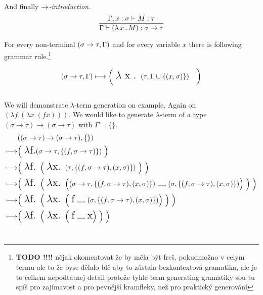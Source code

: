 \documentclass[12pt,a4paper]{report}
\newcommand{\lterm}{$\lambda$-term\xspace}
\newcommand{\tur}[3]{#1\vdash{}#2:#3}
\newcommand\Vtextvisiblespace[1][.3em]{%
  \mbox{\kern.06em\vrule height.3ex}%
  \vbox{\hrule width#1}%
  \hbox{\vrule height.3ex}}
\begin{document}
And finally {\it $\rightarrow$-introduction}. 
$$
\ruleI { \tur{\Gamma,x:\sigma}{M}{\tau} }
       { \tur{\Gamma}{\lamb{x}{M}}{\sigma \ar \tau} }
$$

For every non-terminal $(\sigma \rightarrow \tau,\Gamma)$
and for every variable $x$
there is following grammar rule.\footnote{
\textbf{TODO !!!!} nějak okomentovat že by měla být freš,
pokudmožno v celym termu ale to že byse dělalo blě aby to
zůstala bezkontextová gramatika, ale je to celkem nepodtatnej detail
protože tyhle term generating gramatiky sou tu spíš
pro zajímavost a pro pevnější kramfleky, než pro praktický 
generování}
 


$$ 
	( \sigma \rightarrow \tau , \Gamma )  \longmapsto
	\bigg( \mbox{ {\Large $\lambda$ x . }}( \tau , \Gamma \cup \{ (x,\sigma) \} ) \quad \bigg)
$$\\

We will demonstrate \lterm generation on example. 
Again on $(\lambda f . (\lambda x . (f x) ))$. 
We would like to generate \lterm of a type 
$(\sigma \rightarrow \tau) \rightarrow (\sigma \rightarrow \tau)$
with $\Gamma = \{\}$.
\begin{align*}
	& ((\sigma \rightarrow \tau) \rightarrow (\sigma \rightarrow \tau),\{\}) \\ 
	\gar & \Big( \mbox{ {\Large $\lambda$f.}}
	  ( \sigma \rightarrow \tau , \{ (f,\sigma \rightarrow \tau) \} ) 
	~ \Big)
	\\
	\gar & 
	\Big( \mbox{ {\Large $\lambda$f. }}
		\Big( \mbox{ {\Large $\lambda$x. }}
	  	 	( \tau , \{ (f,\sigma \rightarrow \tau) , (x,\sigma) \} ) 
		~ \Big)  	 
	~ \Big)
	\\
	\gar & 
	\Big( \mbox{ {\Large $\lambda$f. }}
		\Big( \mbox{ {\Large $\lambda$x. }}	  	 	
	  	 	\Big( 
	  	 	  ( \sigma \rightarrow \tau , \{ (f,\sigma \rightarrow \tau) , (x,\sigma) \} ) 
			  \mbox{ \Vtextvisiblespace[1em] } 
			  ( \sigma , \{ (f,\sigma \rightarrow \tau) , (x,\sigma) \} )  \Big) 
		~ \Big)  	 
	 ~ \Big)
	\\
	\gar & 
	\Big( \mbox{ {\Large $\lambda$f. }}
		\Big( \mbox{ {\Large $\lambda$x. }}	  	 	
	  	 	\Big( 
	  	 	  \mbox{ {\Large f}} 
			  \mbox{ \Vtextvisiblespace[1em] } 
			  ( \sigma , \{ (f,\sigma \rightarrow \tau) , (x,\sigma) \} ) \Big) 
		~ \Big)  	 
	~ \Big)		
	\\
	\gar & 
	\Big( \mbox{ {\Large $\lambda$f. }}
		\Big( \mbox{ {\Large $\lambda$x. }}	  	 	
	  	 	\Big( 
	  	 	  \mbox{ {\Large f}} 
			  \mbox{ \Vtextvisiblespace[1em] } 
			  \mbox{{\Large x}} \Big) 
		~ \Big)  	 
	~ \Big)
\end{align*}~\\
\end{document}
